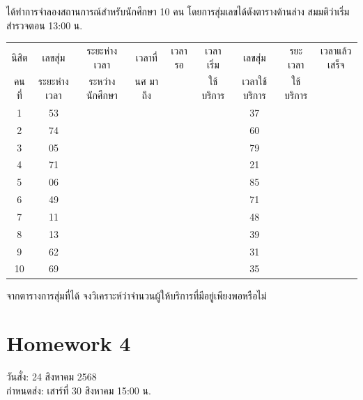 ได้ทำการจำลองสถานการณ์สำหรับนักศึกษา 10 คน โดยการสุ่มเลขได้ดังตารางด้านล่าง สมมติว่าเริ่มสำรวจตอน 13:00 น.\\
\begin{tabular}{|c|c|c|c|c|c|c|c|c|}
\hline
นิสิต  & เลขสุ่ม   & ระยะห่างเวลา  & เวลาที่ & เวลารอ & เวลาเริ่ม  & เลขสุ่ม &รยะเวลา& เวลาแล้วเสร็จ \\
คนที่ & ระยะห่างเวลา&ระหว่างนักศึกษา& นศ มาถึง &  & ใช้บริการ  & เวลาใช้บริการ &ใช้บริการ& \\
\hline 1 & 53 &&&&&37&& \\
\hline 2 & 74 &&&&&60&& \\
\hline 3 & 05 &&&&&79&& \\
\hline 4 & 71 &&&&&21&& \\
\hline 5 & 06 &&&&&85&& \\
\hline 6 & 49 &&&&&71&& \\
\hline 7 & 11 &&&&&48&& \\
\hline 8 & 13 &&&&&39&& \\
\hline 9 & 62 &&&&&31&& \\
\hline 10 & 69 &&&&&35&& \\
\hline
\end{tabular}

จากตารางการสุ่มที่ได้ จงวิเคราะห์ว่าจำนวนผู้ให้บริการที่มีอยู่เพียงพอหรือไม่

\section*{Homework 4}
วันสั่ง: 24 สิงหาคม 2568\\
กำหนดส่ง: เสาร์ที่ 30 สิงหาคม 15:00 น.

